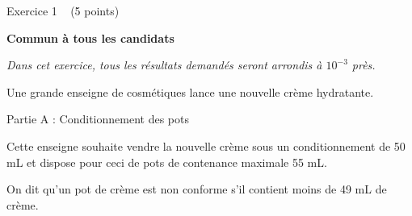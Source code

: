 
%
\begin{h2}Exercice 1   (5 points)\end{h2}
\textbf{Commun  à tous les candidats}
\par
\textit{Dans cet exercice, tous les résultats demandés seront arrondis à $10^{-3}$ près.}
\par
Une grande enseigne de cosmétiques lance une nouvelle crème hydratante.
\begin{h3}Partie A : Conditionnement des pots\end{h3}
Cette enseigne souhaite vendre la nouvelle crème sous un conditionnement de 50 mL et dispose pour ceci de pots de contenance maximale 55 mL.
\par
On dit qu'un pot de crème est non conforme s'il contient moins de 49 mL de crème.
